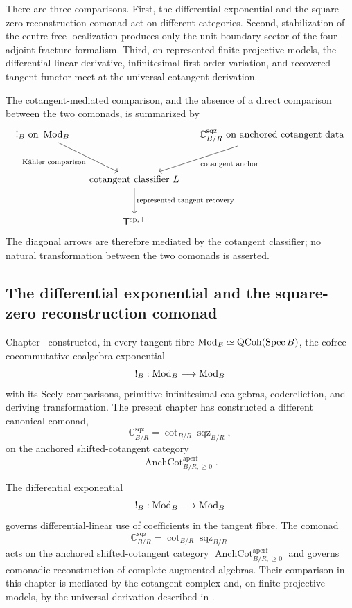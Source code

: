 There are three comparisons. First, the differential exponential and the square-zero
reconstruction comonad act on different categories. Second, stabilization of the
centre-free localization produces only the unit-boundary sector of the four-adjoint
fracture formalism. Third, on represented finite-projective models, the
differential-linear derivative, infinitesimal first-order variation, and recovered
tangent functor meet at the universal cotangent derivation.

The cotangent-mediated comparison, and the absence of a direct comparison between the
two comonads, is summarized by
\[
\begin{tikzcd}[column sep=small,row sep=large]
    !_B\ \text{on }\Mod_B
        \arrow[dr,"\text{K\"ahler comparison}"']
    &&
    \mathbb C^{\mathrm{sqz}}_{B/R}\ \text{on anchored cotangent data}
        \arrow[dl,"\text{cotangent anchor}"]
    \\
    & \text{cotangent classifier }L
        \arrow[d,"\text{represented tangent recovery}"]
    &
    \\
    & \mathsf T^{\mathrm{sp},+}
    &
\end{tikzcd}
\]
The diagonal arrows are therefore mediated by the cotangent classifier; no natural
transformation between the two comonads is asserted.

\subsection{The differential exponential and the square-zero reconstruction comonad}

Chapter~ constructed, in every tangent fibre
\(\operatorname{Mod}_B\simeq\operatorname{QCoh}(\operatorname{Spec} B)\), the cofree cocommutative-coalgebra exponential
\[
    !_B:\operatorname{Mod}_B\longrightarrow\operatorname{Mod}_B
\]
with its Seely comparisons, primitive infinitesimal coalgebras, codereliction, and
deriving transformation. The present chapter has constructed a different canonical
comonad,
\[
    \mathbb C^{\mathrm{sqz}}_{B/R}
    =
    \operatorname{cot}_{B/R}\operatorname{sqz}_{B/R},
\]
on the anchored shifted-cotangent category
\[
    \operatorname{AnchCot}^{\mathrm{aperf}}_{B/R,\geq0}.
\]

\begin{remark}
\label{rem:two-comonads-differentiated-doctrine}
The differential exponential
\[
    !_B:\operatorname{Mod}_B\longrightarrow\operatorname{Mod}_B
\]
governs differential-linear use of coefficients in the tangent fibre. The
comonad
\[
    \mathbb C^{\mathrm{sqz}}_{B/R}
    =
    \operatorname{cot}_{B/R}\operatorname{sqz}_{B/R}
\]
acts on the anchored shifted-cotangent category
\(\operatorname{AnchCot}^{\mathrm{aperf}}_{B/R,\geq0}\) and governs comonadic
reconstruction of complete augmented algebras. Their comparison in this
chapter is mediated by the cotangent complex and, on finite-projective models,
by the universal derivation described in
.
\end{remark}



